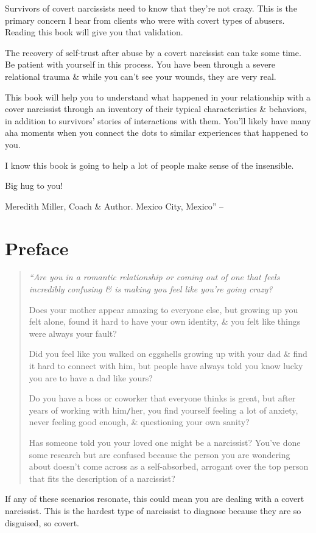 \documentclass{article}
\numberwithin{equation}{section}
\begin{document}
Survivors of covert narcissists need to know that they're not crazy. This is the primary concern I hear from clients who were with covert types of abusers. Reading this book will give you that validation.

The recovery of self-trust after abuse by a covert narcissist can take some time. Be patient with yourself in this process. You have been through a severe relational trauma \& while you can't see your wounds, they are very real.

This book will help you to understand what happened in your relationship with a cover narcissist through an inventory of their typical characteristics \& behaviors, in addition to survivors' stories of interactions with them. You'll likely have many aha moments when you connect the dots to similar experiences that happened to you.

I know this book is going to help a lot of people make sense of the insensible.

Big hug to you!

Meredith Miller, Coach \& Author. Mexico City, Mexico'' -- \cite[pp. 6--8]{Mirza2017}


\section*{Preface}

\begin{quotation}\it
	``Are you in a romantic relationship or coming out of one that feels incredibly confusing \& is making you feel like you're going crazy?
	
	Does your mother appear amazing to everyone else, but growing up you felt alone, found it hard to have your own identity, \& you felt like things were always your fault?
	
	Did you feel like you walked on eggshells growing up with your dad \& find it hard to connect with him, but people have always told you know lucky you are to have a dad like yours?
	
	Do you have a boss or coworker that everyone thinks is great, but after years of working with him\texttt{/}her, you find yourself feeling a lot of anxiety, never feeling good enough, \& questioning your own sanity?
	
	Has someone told you your loved one might be a narcissist? You've done some research but are confused because the person you are wondering about doesn't come across as a self-absorbed, arrogant over the top person that fits the description of a narcissist?
\end{quotation}
If any of these scenarios resonate, this could mean you are dealing with a covert narcissist. This is the hardest type of narcissist to diagnose because they are so disguised, so covert.
\end{document}
